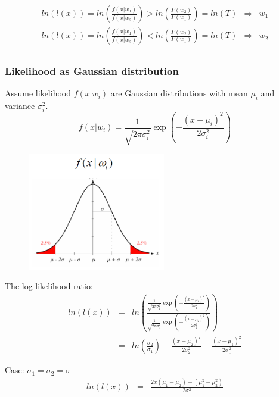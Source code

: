 \documentclass[letterpaper,10pt]{article}
\begin{document}
\begin{equation}
\begin{array}{rcl}
ln(l(x)) = ln(\frac{f(x|w_1)}{f(x|w_2)}) > ln(\frac{P(w_2)}{P(w_1)}) = ln(T) & \Rightarrow & w_1 \\
ln(l(x)) = ln(\frac{f(x|w_1)}{f(x|w_2)}) < ln(\frac{P(w_2)}{P(w_1)}) = ln(T) & \Rightarrow & w_2 \\
\end{array}
\end{equation}

\subsubsection{Likelihood as Gaussian distribution}
Assume likelihood $f(x|w_i)$ are Gaussian distributions with mean $\mu_i$ and variance $\sigma_i^2$.
\begin{equation}
f(x|w_i)=\frac{1}{\sqrt{2\pi\sigma_i^2}}\exp\left(-\frac{(x-\mu_i)^2}{2\sigma_i^2}\right)
\end{equation}
\begin{figure}[!ht]
	\centering
	\includegraphics[width=6cm]{./img/gaussian_distribution_likelihood.png}
\end{figure}
The log likelihood ratio:
\begin{equation}
\begin{array}{rcl}
ln(l(x)) & = & ln\left(\frac{\frac{1}{\sqrt{2\pi\sigma_1^2}}\exp\left(-\frac{(x-\mu_1)^2}{2\sigma_1^2}\right)}{\frac{1}{\sqrt{2\pi\sigma_2^2}}\exp\left(-\frac{(x-\mu_2)^2}{2\sigma_2^2}\right)}\right) \\
         & = & ln(\frac{\sigma_2}{\sigma_1})+\frac{(x-\mu_2)^2}{2\sigma_2^2}-\frac{(x-\mu_1)^2}{2\sigma_1^2}
\end{array}
\end{equation}

Case: $\sigma_1=\sigma_2=\sigma$
\begin{equation}
\begin{array}{rcl}
ln(l(x)) & = & \frac{2x(\mu_1-\mu_2)-(\mu_1^2-\mu_2^2)}{2\sigma^2}
\end{array}
\end{equation}
\end{document}
